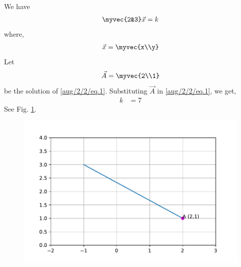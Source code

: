 
We have
\begin{align}
    \myvec{2&3}\vec{x}=k \label{aug/2/2/eq.1}
\end{align}
where,
\begin{align}
    \vec{x}=\myvec{x\\y}
\end{align}
Let \begin{align}
    \vec{A}=\myvec{2\\1}
\end{align}
be the solution of \eqref{aug/2/2/eq.1}.
Substituting $\vec{A}$ in \eqref{aug/2/2/eq.1}, we get,
\begin{align}
 k &=7
\end{align}
See Fig. \ref{aug/2/2/Fig 1.1}.
\begin{figure}[h]
\centering
\includegraphics[width=\columnwidth]{solutions/aug/2/2/Figures/line.pdf}
\label{aug/2/2/Fig 1.1}
\caption{}
\end{figure}
